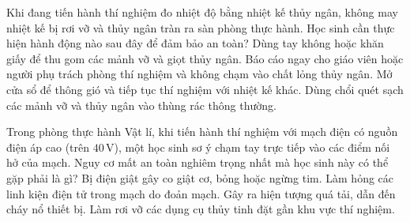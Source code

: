 \begin{ex}
Khi đang tiến hành thí nghiệm đo nhiệt độ bằng nhiệt kế thủy ngân, không may nhiệt kế bị rơi vỡ và thủy ngân tràn ra sàn phòng thực hành. Học sinh cần thực hiện hành động nào sau đây để đảm bảo an toàn?
\choice
{Dùng tay không hoặc khăn giấy để thu gom các mảnh vỡ và giọt thủy ngân.}
{\True Báo cáo ngay cho giáo viên hoặc người phụ trách phòng thí nghiệm và không chạm vào chất lỏng thủy ngân.}
{Mở cửa sổ để thông gió và tiếp tục thí nghiệm với nhiệt kế khác.}
{Dùng chổi quét sạch các mảnh vỡ và thủy ngân vào thùng rác thông thường.}
\end{ex}

\begin{ex}
Trong phòng thực hành Vật lí, khi tiến hành thí nghiệm với mạch điện có nguồn điện áp cao (trên $40\,\text{V}$), một học sinh sơ ý chạm tay trực tiếp vào các điểm nối hở của mạch. Nguy cơ mất an toàn nghiêm trọng nhất mà học sinh này có thể gặp phải là gì?
\choice
{\True Bị điện giật gây co giật cơ, bỏng hoặc ngừng tim.}
{Làm hỏng các linh kiện điện tử trong mạch do đoản mạch.}
{Gây ra hiện tượng quá tải, dẫn đến cháy nổ thiết bị.}
{Làm rơi vỡ các dụng cụ thủy tinh đặt gần khu vực thí nghiệm.}
\end{ex}

